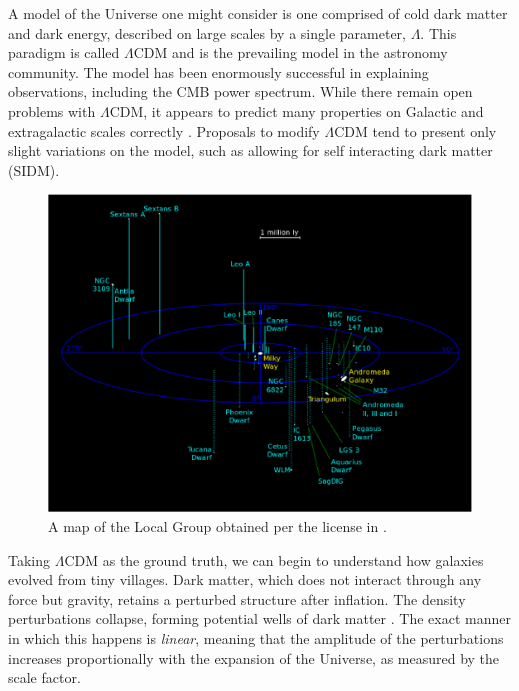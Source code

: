 A model of the Universe one might consider is one comprised of cold dark matter and dark energy, described on large scales by a single parameter, $\Lambda$. This paradigm is called $\Lambda$CDM and is the prevailing model in the astronomy community. The model has been enormously successful in explaining observations, including the CMB power spectrum. While there remain open problems with $\Lambda$CDM, it appears to predict many properties on Galactic and extragalactic scales correctly \citep{kolb_turner,dodelson, BT}. Proposals to modify $\Lambda$CDM tend to present only slight variations on the model, such as allowing for self interacting dark matter (SIDM).
\begin{figure}
	\includegraphics[width=\textwidth]{../figures/local_group}
	\caption{A map of the Local Group obtained per the license in \citet{local_group_map}.}\label{fig:local_group}
\end{figure}


Taking $\Lambda$CDM as the ground truth, we can begin to understand how galaxies evolved from tiny villages. Dark matter, which does not interact through any force but gravity, retains a perturbed structure after inflation. The density perturbations collapse, forming potential wells of dark matter \citep{taylor_2011}. The exact manner in which this happens is \textit{linear}, meaning that the amplitude of the perturbations increases proportionally with the expansion of the Universe, as measured by the scale factor. 


